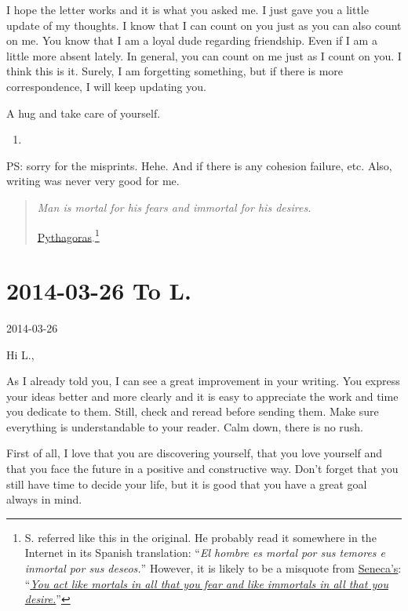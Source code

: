 \documentclass[]{book}
\let\rmarkdownfootnote\footnote%
\def\footnote{\protect\rmarkdownfootnote}
\begin{document}
I hope the letter works and it is what you asked me. I just gave you a little update of my thoughts. I know that I can count on you just as you can also count on me. You know that I am a loyal dude regarding friendship. Even if I am a little more absent lately. In general, you can count on me just as I count on you. I think this is it. Surely, I am forgetting something, but if there is more correspondence, I will keep updating you.

A hug and take care of yourself.

\begin{enumerate}
\def\labelenumi{\Alph{enumi}.}
\setcounter{enumi}{18}
\item
\end{enumerate}

PS: sorry for the misprints. Hehe. And if there is any cohesion failure, etc. Also, writing was never very good for me.

\begin{quote}
\emph{Man is mortal for his fears and immortal for his desires.}

\href{https://en.wikipedia.org/wiki/Pythagoras}{Pythagoras}.\footnote{S. referred like this in the original. He probably read it somewhere in the Internet in its Spanish translation: ``\emph{El hombre es mortal por sus temores e inmortal por sus deseos.}'' However, it is likely to be a misquote from \href{https://en.wikipedia.org/wiki/Seneca_the_Younger}{Seneca's}: ``\emph{\href{https://medium.com/aryas-books/my-thoughts-on-on-the-shortness-of-life-by-seneca-faddc948956}{You act like mortals in all that you fear and like immortals in all that you desire.}}''\citep{seneca2004shortness}}
\end{quote}

\hypertarget{toL20140326}{%
\section*{2014-03-26 To L.}\label{toL20140326}}

2014-03-26

Hi L.,

As I already told you, I can see a great improvement in your writing. You express your ideas better and more clearly and it is easy to appreciate the work and time you dedicate to them. Still, check and reread before sending them. Make sure everything is understandable to your reader. Calm down, there is no rush.

First of all, I love that you are discovering yourself, that you love yourself and that you face the future in a positive and constructive way. Don't forget that you still have time to decide your life, but it is good that you have a great goal always in mind.
\end{document}
